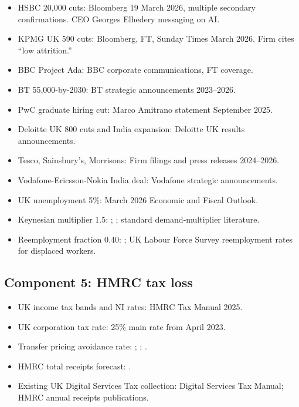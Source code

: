 \documentclass[11pt,letterpaper]{article}
\theoremstyle{remark}
\begin{document}
\begin{itemize}
\item HSBC 20,000 cuts: Bloomberg 19 March 2026, multiple secondary confirmations. CEO Georges Elhedery messaging on AI.
\item KPMG UK 590 cuts: Bloomberg, FT, Sunday Times March 2026. Firm cites ``low attrition.''
\item BBC Project Ada: BBC corporate communications, FT coverage.
\item BT 55,000-by-2030: BT strategic announcements 2023--2026.
\item PwC graduate hiring cut: Marco Amitrano statement September 2025.
\item Deloitte UK 800 cuts and India expansion: Deloitte UK results announcements.
\item Tesco, Sainsbury's, Morrisons: Firm filings and press releases 2024--2026.
\item Vodafone-Ericsson-Nokia India deal: Vodafone strategic announcements.
\item UK unemployment 5\%: \citet{obr_2026} March 2026 Economic and Fiscal Outlook.
\item Keynesian multiplier 1.5: \citet{cooper_john_1988}; \citet{murphy_shleifer_vishny_1989}; standard demand-multiplier literature.
\item Reemployment fraction 0.40: \citet{jacobson_lalonde_sullivan_1993}; UK Labour Force Survey reemployment rates for displaced workers.
\end{itemize}

\subsection{Component 5: HMRC tax loss}

\begin{itemize}
\item UK income tax bands and NI rates: HMRC Tax Manual 2025.
\item UK corporation tax rate: 25\% main rate from April 2023.
\item Transfer pricing avoidance rate: \citet{torslov_wier_zucman_2018, torslov_wier_zucman_2023}; \citet{bilicka_2019}; \citet{garcia_bernardo_2025}.
\item HMRC total receipts forecast: \citet{obr_2026}.
\item Existing UK Digital Services Tax collection: \citet{hmrc_2020} Digital Services Tax Manual; HMRC annual receipts publications.
\end{itemize}
\end{document}
